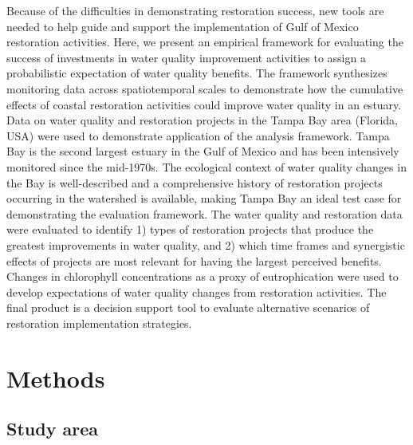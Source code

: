 \documentclass[]{article}
\begin{document}
Because of the difficulties in demonstrating restoration success, new
tools are needed to help guide and support the implementation of Gulf of
Mexico restoration activities. Here, we present an empirical framework
for evaluating the success of investments in water quality improvement
activities to assign a probabilistic expectation of water quality
benefits. The framework synthesizes monitoring data across
spatiotemporal scales to demonstrate how the cumulative effects of
coastal restoration activities could improve water quality in an
estuary. Data on water quality and restoration projects in the Tampa Bay
area (Florida, USA) were used to demonstrate application of the analysis
framework. Tampa Bay is the second largest estuary in the Gulf of Mexico
and has been intensively monitored since the mid-1970s. The ecological
context of water quality changes in the Bay is well-described and a
comprehensive history of restoration projects occurring in the watershed
is available, making Tampa Bay an ideal test case for demonstrating the
evaluation framework. The water quality and restoration data were
evaluated to identify 1) types of restoration projects that produce the
greatest improvements in water quality, and 2) which time frames and
synergistic effects of projects are most relevant for having the largest
perceived benefits. Changes in chlorophyll concentrations as a proxy of
eutrophication were used to develop expectations of water quality
changes from restoration activities. The final product is a decision
support tool to evaluate alternative scenarios of restoration
implementation strategies.

\section{Methods}\label{methods}

\subsection{Study area}\label{study-area}
\end{document}
